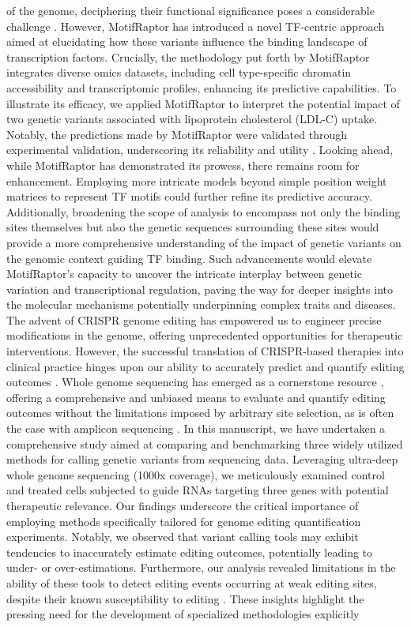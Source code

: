 \documentclass[a4paper, titlepage, openright]{book}
\newcommand{\motifraptor}{MotifRaptor\xspace}
\begin{document}
of the genome, deciphering their functional significance poses a considerable challenge \citep{maurano2012systematic}. However, \motifraptor has introduced a novel TF-centric approach aimed at elucidating how these variants influence the binding landscape of transcription factors. Crucially, the methodology put forth by \motifraptor integrates diverse omics datasets, including cell type-specific chromatin accessibility and transcriptomic profiles, enhancing its predictive capabilities. To illustrate its efficacy, we applied \motifraptor to interpret the potential impact of two genetic variants associated with lipoprotein cholesterol (LDL-C) uptake. Notably, the predictions made by \motifraptor were validated through experimental validation, underscoring its reliability and utility \citep{ryu2023joint}. Looking ahead, while \motifraptor has demonstrated its prowess, there remains room for enhancement. Employing more intricate models beyond simple position weight matrices to represent TF motifs could further refine its predictive accuracy. Additionally, broadening the scope of analysis to encompass not only the binding sites themselves but also the genetic sequences surrounding these sites would provide a more comprehensive understanding of the impact of genetic variants on the genomic context guiding TF binding. Such advancements would elevate \motifraptor's capacity to uncover the intricate interplay between genetic variation and transcriptional regulation, paving the way for deeper insights into the molecular mechanisms potentially underpinning complex traits and diseases. The advent of CRISPR genome editing \citep{cong2013multiplex} has empowered us to engineer precise modifications in the genome, offering unprecedented opportunities for therapeutic interventions. However, the successful translation of CRISPR-based therapies into clinical practice hinges upon our ability to accurately predict and quantify editing outcomes \citep{fu2013high}. Whole genome sequencing has emerged as a cornerstone resource \citep{yin2022cas9}, offering a comprehensive and unbiased means to evaluate and quantify editing outcomes without the limitations imposed by arbitrary site selection, as is often the case with amplicon sequencing \citep{akcakaya2018vivo}. In this manuscript, we have undertaken a comprehensive study aimed at comparing and benchmarking three widely utilized methods \citep{mckenna2010genome,kim2018strelka2,koboldt2012varscan} for calling genetic variants from sequencing data. Leveraging ultra-deep whole genome sequencing (1000x coverage), we meticulously examined control and treated cells subjected to guide RNAs targeting three genes with potential therapeutic relevance. Our findings underscore the critical importance of employing methods specifically tailored for genome editing quantification experiments. Notably, we observed that variant calling tools may exhibit tendencies to inaccurately estimate editing outcomes, potentially leading to under- or over-estimations. Furthermore, our analysis revealed limitations in the ability of these tools to detect editing events occurring at weak editing sites, despite their known susceptibility to editing \citep{tsai2015guide}. These insights highlight the pressing need for the development of specialized methodologies explicitly 
\end{document}
